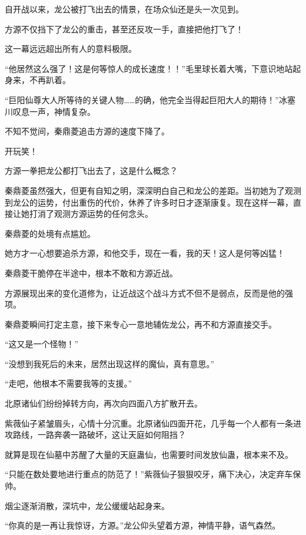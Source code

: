 
\begin{this_body}



自开战以来，龙公被打飞出去的情景，在场众仙还是头一次见到。

方源不仅挡下了龙公的重击，甚至还反攻一手，直接把他打飞了！

这一幕远远超出所有人的意料极限。

“他居然这么强了！这是何等惊人的成长速度！！”毛里球长着大嘴，下意识地站起身来，不再趴着。

“巨阳仙尊大人所等待的关键人物……的确，他完全当得起巨阳大人的期待！”冰塞川叹息一声，神情复杂。

不知不觉间，秦鼎菱追击方源的速度下降了。

开玩笑！

方源一拳把龙公都打飞出去了，这是什么概念？

秦鼎菱虽然强大，但更有自知之明，深深明白自己和龙公的差距。当初她为了观测到龙公的运势，付出重伤的代价，休养了许多时日才逐渐康复。现在这样一幕，直接让她打消了观测方源运势的任何念头。

秦鼎菱的处境有点尴尬。

她方才一心想要追杀方源，和他交手，现在一看，我的天！这人是何等凶猛！

秦鼎菱干脆停在半途中，根本不敢和方源近战。

方源展现出来的变化道修为，让近战这个战斗方式不但不是弱点，反而是他的强项。

秦鼎菱瞬间打定主意，接下来专心一意地辅佐龙公，再不和方源直接交手。

“这又是一个怪物！”

“没想到我死后的未来，居然出现这样的魔仙，真有意思。”

“走吧，他根本不需要我等的支援。”

北原诸仙们纷纷掉转方向，再次向四面八方扩散开去。

紫薇仙子紧皱眉头，心情十分沉重。北原诸仙四面开花，几乎每一个人都有一条进攻路线，一路奔袭一路破坏，这让天庭如何阻挡？

就算是现在仙墓中苏醒了大量的天庭蛊仙，也需要时间发放仙蛊，根本来不及。

“只能在数处要地进行重点的防范了！”紫薇仙子狠狠咬牙，痛下决心，决定弃车保帅。

烟尘逐渐消散，深坑中，龙公缓缓站起身来。

“你真的是一再让我惊讶，方源。”龙公仰头望着方源，神情平静，语气森然。


\end{this_body}
